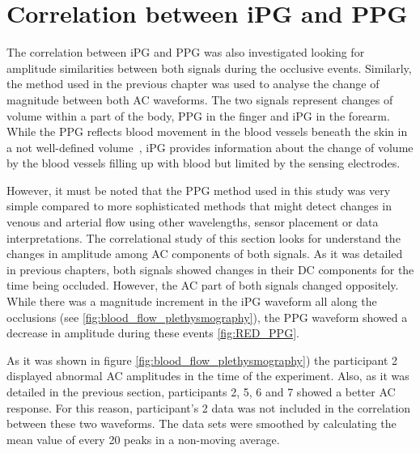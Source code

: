 \section{Correlation between iPG and PPG}  %
\label{section correlation 3}
The correlation between iPG and PPG was also investigated looking for amplitude similarities between both signals during the occlusive events. Similarly, the method used in the previous chapter was used to analyse the change of magnitude between both AC waveforms. The two signals represent changes of volume within a part of the body, PPG in the finger and iPG in the forearm. While the PPG reflects blood movement in the blood vessels beneath the skin in a not well-defined volume~\cite{elgendi2012analysis}, iPG provides information about the change of volume by the blood vessels filling up with blood but limited by the sensing electrodes.

However, it must be noted that the PPG method used in this study was very simple compared to more sophisticated methods that might detect changes in venous and arterial flow using other wavelengths, sensor placement or data interpretations. The correlational study of this section looks for understand the changes in amplitude among AC components of both signals. As it was detailed in previous chapters, both signals showed changes in their DC components for the time being occluded. However, the AC part of both signals changed oppositely. While there was a magnitude increment in the iPG waveform all along the occlusions (see \ref{fig:blood_flow_plethysmography}), the PPG waveform showed a decrease in amplitude during these events \ref{fig:RED_PPG}.

As it was shown in figure \ref{fig:blood_flow_plethysmography}) the participant 2 displayed abnormal AC amplitudes in the time of the experiment. Also, as it was detailed in the previous section, participants 2, 5, 6 and 7 showed a better AC response. For this reason, participant's 2 data was not included in the correlation between these two waveforms. The data sets were smoothed by calculating the mean value of every 20 peaks in a non-moving average.

